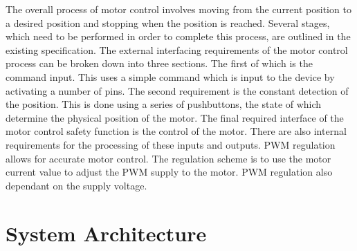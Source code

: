 The overall process of motor control involves moving from the current position to a desired position and stopping when the position is reached. Several stages, which need to be performed in order to complete this process, are outlined in the existing specification. 
The external interfacing requirements of the motor control process can be broken down into three sections. The first of which is the command input. This uses a simple command which is input to the device by activating a number of pins. 
The second requirement is the constant detection of the position. This is done using a series of pushbuttons, the state of which determine the physical position of the motor. 
The final required interface of the motor control safety function is the control of the motor.  
There are also internal requirements for the processing of these inputs and outputs. 
PWM regulation allows for accurate motor control. The regulation scheme is to use the motor current value to adjust the PWM supply to the motor. PWM regulation also dependant on the supply voltage. 






\section{System Architecture}

